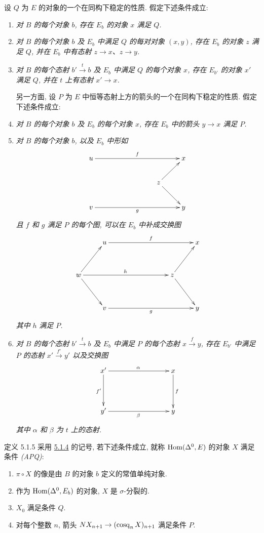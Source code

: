 设 $Q$ 为 $E$ 的对象的一个在同构下稳定的性质. 假定下述条件成立:
\begin{enumerate}
\renewcommand{\theenumi}{\alph{enumi}}
\renewcommand{\labelenumi}{\theenumi)}
\item \emph{对 $B$ 的每个对象 $b$, 存在 $E_b$ 的对象 $x$ 满足 $Q$.}

\item \emph{对 $B$ 的每个对象 $b$ 及 $E_b$ 中满足 $Q$ 的每对对象 $(x,y)$,
存在 $E_b$ 的对象 $z$ 满足 $Q$, 并在 $E_b$ 中有态射 $z\to x$、$z\to y$.}

\item \emph{对 $B$ 的每个态射 $b'\xrightarrow{t}b$ 及 $E_b$ 中满足 $Q$ 的每个对象 $x$,
存在 $E_{b'}$ 的对象 $x'$ 满足 $Q$, 并在 $t$ 上有态射 $x'\to x$.}

另一方面, 设 $P$ 为 $E$ 中恒等态射上方的箭头的一个在同构下稳定的性质.
假定下述条件成立:

\item \emph{对 $B$ 的每个对象 $b$ 及 $E_b$ 的每个对象 $x$,
存在 $E_b$ 中的箭头 $y\to x$ 满足 $P$.}

\item \emph{对 $B$ 的每个对象 $b$, 以及 $E_b$ 中形如}
\[
\xymatrix{
u \ar[rrrr]^{f} & & &                 &x\\
                & & &z\ar[ru]\ar[rd] &\\
v \ar[rrrr]_{g} & & &               & y
}
\]
\emph{且 $f$ 和 $g$ 满足 $P$ 的每个图, 可以在 $E_b$ 中补成交换图}
\[
\xymatrix@R=1.25cm{
  & u\ar[rrrr]^{f} & & &  & x\\
w\ar[rrrr]^{h}\ar[ru]\ar[rd] &   & & &z\ar[ru]\ar[rd] & \\
  & v\ar[rrrr]_{g} & & &  & y
}
\]
\emph{其中}\pageoriginale{} $h$ \emph{满足 $P$.}

\item \emph{对 $B$ 的每个态射 $b'\xrightarrow{t}b$
及 $E_b$ 中满足 $P$ 的每个态射 $x\xrightarrow{f}y$,
存在 $E_{b'}$ 中满足 $P$ 的态射 $x'\xrightarrow{f'}y'$ 以及交换图}
\[
\xymatrix@C=3cm@R=1.5cm{
x' \ar[r]^{\alpha} \ar[d]_{f'}& x\ar[d]^{f}\\
y' \ar[r]_{\beta}& y
}
\]
\emph{其中 $\alpha$ 和 $\beta$ 为 $t$ 上的态射.}
\end{enumerate}

\begin{enonce*}{定义 5.1.5}
采用 \hyperref[Vbis.subsubsec5.1.4]{5.1.4} 的记号,
若下述条件成立, 就称 $\operatorname{Hom}(\Delta^0,E)$ 的对象 $X$ 满足条件 \emph{(APQ)}:
\begin{enumerate}
\item[(i)] $\pi\circ X$ 的像是由 $B$ 的对象 $b$ 定义的常值单纯对象.

\item[(ii)] 作为 $\operatorname{Hom}(\Delta^0,E_b)$ 的对象, $X$ 是 $\sigma$-分裂的.

\item[(iii)] $X_0$ 满足条件 $Q$.

\item[(iv)] 对每个整数 $n$, 箭头 $NX_{n+1}\to(\cosq_nX)_{n+1}$ 满足条件 $P$.
\end{enumerate}
\end{enonce*}

